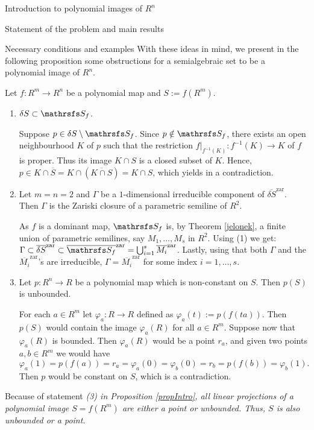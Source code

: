\documentclass[11pt, a4paper, english, twoside, notitlepage, openright]{report}
\begin{document}
\begin{chapter}{Introduction to polynomial images of $R^n$}
\begin{section}{Statement of the problem and main results}
\begin{subsection}{Necessary conditions and examples}
With these ideas in mind, we present in the following proposition some obstructions for a semialgebraic set to be a polynomial image of $R^n$. 
\begin{proposition}\label{propIntro} Let $f: R^m\to R^n$ be a polynomial map and $S:=f(R^m)$.
\begin{enumerate}[\em(1)\em]
\item $\delta S \subset\S_f$.
\begin{Proof} Suppose $p\in\delta S\setminus \S_f$. Since $p\notin\S_f$, there exists an open neighbourhood $K$ of $p$ such that the restriction $f|_{f^{-1}(K)}:f^{-1}(K)\to K$ of $f$ is proper. Thus its image $K\cap S$ is a closed subset of $K$. Hence, $p\in K\cap\overline{S}=K\cap(\overline{K\cap S})=K\cap S$, which yields in a contradiction.
\end{Proof}
\item Let $m=n=2$ and $\Gamma$ be a $1$-dimensional irreducible component of $\overline{\delta S}^{\text{zar}}$. Then $\Gamma$ is the Zariski closure of a parametric semiline of $R^2$.
\begin{Proof} As $f$ is a dominant map, $\S_f$ is, by Theorem \ref{jelonek}, a finite union of parametric semilines, say $M_1,\dots, M_s$ in $R^2$. Using (1) we get: $\Gamma\subset\overline{\delta S}^{\text{zar}}\subset \overline{\S_f}^{\text{zar}}=\bigcup_{i=1}^s\overline{M_i}^{\text{zar}}$. Lastly, using that both $\Gamma$ and the $\overline{M_i}^{\text{zar}}$'s are irreducible, $\Gamma=\overline{M_i}^{\text{zar}}$ for some index $i=1,\dots,s$.
\end{Proof}
\item Let $p:R^n\to R$ be a polynomial map which is non-constant on $S$. Then $p(S)$ is unbounded.
\begin{Proof} For each $a \in R^m$ let $\varphi_a:R\to R$ defined as $\varphi_a(t):=p(f(ta))$. Then $p(S)$ would contain the image $\varphi_a(R)$ for all $a\in R^m$. Suppose now that $\varphi_a(R)$ is bounded. Then $\varphi_a(R)$ would be a point $r_a$, and given two points $a,b\in R^m$ we would have
$$ 
\varphi_a(1)=p(f(a))=r_a=\varphi_a(0)=\varphi_b(0)=r_b=p(f(b))=\varphi_b(1).
$$ 
Then $p$ would be constant on $S$, which is a contradiction.
\end{Proof}
\end{enumerate}
\end{proposition}	
\begin{corollary} Because of statement \em (3) \em in Proposition \em \ref{propIntro}, \em all linear projections of a polynomial image $S=f(R^m)$ are either a point or unbounded. Thus, $S$ is also unbounded or a point.
\end{corollary}
	

\end{subsection}
\end{section}
\end{chapter}
\end{document}
